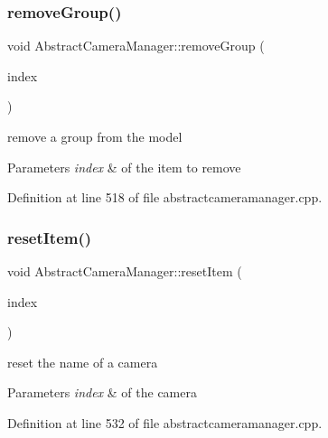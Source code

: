 \mbox{\label{class_abstract_camera_manager_a5eea7f4d2ab3ea314020b405550b378c}} 
\subsubsection{\texorpdfstring{removeGroup()}{removeGroup()}}
{\footnotesize\ttfamily void Abstract\+Camera\+Manager\+::remove\+Group (\begin{DoxyParamCaption}\item[{Q\+Model\+Index}]{index }\end{DoxyParamCaption})}



remove a group from the model 


\begin{DoxyParams}{Parameters}
{\em index} & of the item to remove \\
\hline
\end{DoxyParams}


Definition at line 518 of file abstractcameramanager.\+cpp.

\mbox{\label{class_abstract_camera_manager_a89cd0d1f9bb47d4abda51ea4f1e08f49}} 
\subsubsection{\texorpdfstring{resetItem()}{resetItem()}}
{\footnotesize\ttfamily void Abstract\+Camera\+Manager\+::reset\+Item (\begin{DoxyParamCaption}\item[{Q\+Model\+Index}]{index }\end{DoxyParamCaption})}



reset the name of a camera 


\begin{DoxyParams}{Parameters}
{\em index} & of the camera \\
\hline
\end{DoxyParams}


Definition at line 532 of file abstractcameramanager.\+cpp.

